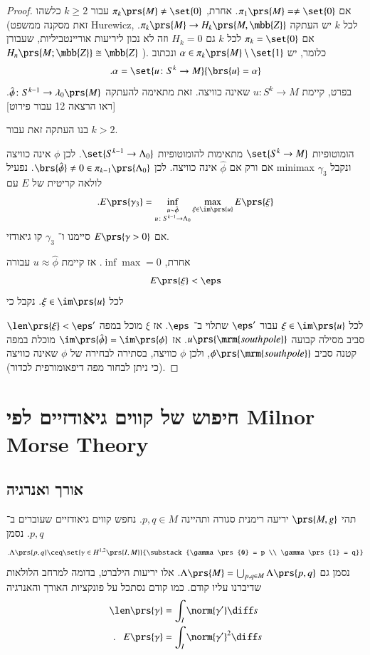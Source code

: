 \documentclass[a4paper,10pt,twoside,openany]{book}
\begin{document}
\begin{proof}
אם
$\pi_1\prs{M} = \neq \set{0}$.
אחרת,
$\pi_k \prs{M} \neq \set{0}$
עבור
$k \geq 2$
כלשהו (זאת מסקנה ממשפט \textenglish{Hurewicz}, לכל
$k$
יש העתקה
$\pi_k \prs{M} \to H_k\prs{M,\mbb{Z}}$.
אם
$\pi_k = \set{0}$
לכל
$k$
גם
$H_k = 0$
וזה לא נכון ליריעות אוריינטביליות, שעבורן
$H_n\prs{M;\mbb{Z}} \cong \mbb{Z}$%
).
כלומר, יש
$\alpha \in \pi_k\prs{M} \setminus \set{1}$
ונכתוב
\[\text{.} \alpha = \set{u \colon S^k \to M}{\brs{u} = \alpha}\]
בפרט, קיימת
$u \colon S^k \to M$
שאינה כוויצה.
זאת מתאימה להעתקה
$\hat{\phi} \colon S^{k-1} \to \lambda_0\prs{M}$.
[ראו הרצאה 12 עבור פירוט]

\begin{exercise}
בנו העתקה זאת עבור
$k > 2$.
\end{exercise}

הומוטופיות
$\set{S^k \to M}$
מתאימות להומוטופיות
$\set{S^{k-1} \to \Lambda_0}$.
לכן
$\phi$
אינה כוויצה אם ורק אם
$\hat{\phi}$
אינה כוויצה.
לכן
$\brs{\hat{\phi}} \neq 0 \in \pi_{k-1}\prs{\Lambda_0}$.
נפעיל
\textenglish{minimax}
ונקבל
$\gamma_3$
לולאה קריטית של
$E$
עם
\[\text{.} E\prs{\gamma_3} = \inf_{\substack{u \sim \hat{\phi} \\ u \colon S^{k-1} \to \Lambda_0}} \max_{\xi \in \im\prs{u}} E\prs{\xi}\]
אם
$E\prs{\gamma > 0}$
סיימנו ו־%
$\gamma_3$
קו גיאודזי.

אחרת,
$\inf \max = 0$.
אז קיימת
$u \approx \hat{\phi}$
עבורה
\[E\prs{\xi} < \eps\]
לכל
$\xi \in \im\prs{u}$.
נקבל כי

$\len\prs{\xi} < \eps'$
לכל
$\xi \in \im\prs{u}$
עבור
$\eps'$
שתלוי ב־%
$\eps$.
אז
$\xi$
מוכל במפה סביב מסילה קבועה
$u\prs{\mrm{south pole}}$.
אז
$\im \prs{\hat{\phi}} = \im\prs{\phi}$
מוכלת במפה קטנה סביב
$\phi\prs{\mrm{south pole}}$,
ולכן
$\phi$
כוויצה, בסתירה לבחירה של
$\phi$
שאינה כוויצה (כי ניתן לבחור מפה דיפאומורפית לכדור).
\end{proof}


\chapter{חיפוש של קווים גיאודזיים לפי \textenglish{Milnor Morse Theory}}

\section{אורך ואנרגיה}

תהי
$\prs{M,g}$
יריעה רימנית סגורה ותהיינה
$p,q \in M$.
נחפש קווים  גיאודזיים שעוברים ב־%
$p,q$.
נסמן
\[\text{.} \Lambda\prs{p,q} \ceq \set{\gamma \in H^{1,2} \prs{I,M}}{\substack{\gamma\prs{0} = p \\ \gamma\prs{1} = q}}\]
נסמן גם
$\Lambda\prs{M} = \bigcup_{p,q \in M} \Lambda \prs{p,q}$.
אלו יריעות הילברט, בדומה למרחב הלולאות שדיברנו עליו קודם.
כמו קודם נסתכל על פונקציות האורך והאנרגיה
\begin{align*}
\len\prs{\gamma} &= \int_I \norm{\gamma'} \diff s \\
\text{.} \hphantom{la} E\prs{\gamma} &= \int_I \norm{\gamma'}^2 \diff s
\end{align*}
\end{document}
